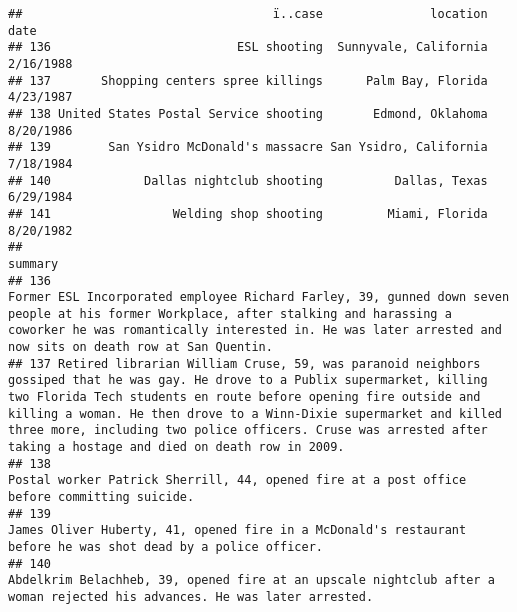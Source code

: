 \documentclass[
]{article}
\begin{document}
\begin{verbatim}
##                                   ï..case               location      date
## 136                          ESL shooting  Sunnyvale, California 2/16/1988
## 137       Shopping centers spree killings      Palm Bay, Florida 4/23/1987
## 138 United States Postal Service shooting       Edmond, Oklahoma 8/20/1986
## 139        San Ysidro McDonald's massacre San Ysidro, California 7/18/1984
## 140             Dallas nightclub shooting          Dallas, Texas 6/29/1984
## 141                 Welding shop shooting         Miami, Florida 8/20/1982
##                                                                                                                                                                                                                                                                                                                                                                                          summary
## 136                                                                                                                                            Former ESL Incorporated employee Richard Farley, 39, gunned down seven people at his former Workplace, after stalking and harassing a coworker he was romantically interested in. He was later arrested and now sits on death row at San Quentin.
## 137 Retired librarian William Cruse, 59, was paranoid neighbors gossiped that he was gay. He drove to a Publix supermarket, killing two Florida Tech students en route before opening fire outside and killing a woman. He then drove to a Winn-Dixie supermarket and killed three more, including two police officers. Cruse was arrested after taking a hostage and died on death row in 2009.
## 138                                                                                                                                                                                                                                                                                                  Postal worker Patrick Sherrill, 44, opened fire at a post office before committing suicide.
## 139                                                                                                                                                                                                                                                                                James Oliver Huberty, 41, opened fire in a McDonald's restaurant before he was shot dead by a police officer.
## 140                                                                                                                                                                                                                                                                     Abdelkrim Belachheb, 39, opened fire at an upscale nightclub after a woman rejected his advances. He was later arrested.

\end{verbatim}
\end{document}
